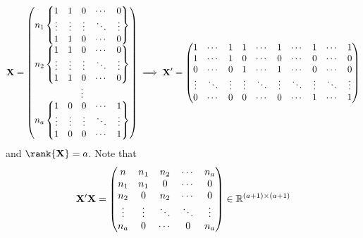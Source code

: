 \[ \mathbf{X}=\begin{pmatrix}
        n_1\begin{Bmatrix}
               1      & 1      & 0      & \cdots & 0      \\
               \vdots & \vdots & \vdots & \ddots & \vdots \\
               1      & 1      & 0      & \cdots & 0      \\
           \end{Bmatrix} \\
        n_2\begin{Bmatrix}
               1      & 1      & 0      & \cdots & 0      \\
               \vdots & \vdots & \vdots & \ddots & \vdots \\
               1      & 1      & 0      & \cdots & 0      \\
           \end{Bmatrix} \\
        \vdots                                        \\
        n_a\begin{Bmatrix}
               1      & 0      & 0      & \cdots & 1      \\
               \vdots & \vdots & \vdots & \ddots & \vdots \\
               1      & 0      & 0      & \cdots & 1      \\
           \end{Bmatrix}
    \end{pmatrix}\implies
    \mathbf{X}'=\begin{pmatrix}
        1      & \cdots & 1      & 1      & \cdots & 1      & \cdots & 1      & \cdots & 1      \\
        1      & \cdots & 1      & 0      & \cdots & 0      & \cdots & 0      & \cdots & 0      \\
        0      & \cdots & 0      & 1      & \cdots & 1      & \cdots & 0      & \cdots & 0      \\
        \vdots & \ddots & \vdots & \vdots & \ddots & \vdots & \ddots & \vdots & \ddots & \vdots \\
        0      & \cdots & 0      & 0      & \cdots & 0      & \cdots & 1      & \cdots & 1
    \end{pmatrix} \]
and $ \rank{\Matrix{X}}=a $. Note that
\[ \mathbf{X}'\mathbf{X}=\begin{pmatrix}
        n      & n_1    & n_2    & \cdots & n_a    \\
        n_1    & n_1    & 0      & \cdots & 0      \\
        n_2    & 0      & n_2    & \cdots & 0      \\
        \vdots & \vdots & \ddots & \ddots & \vdots \\
        n_a    & 0      & \cdots & 0      & n_a
    \end{pmatrix}\in\mathbb{R}^{(a+1)\times (a+1)} \]
